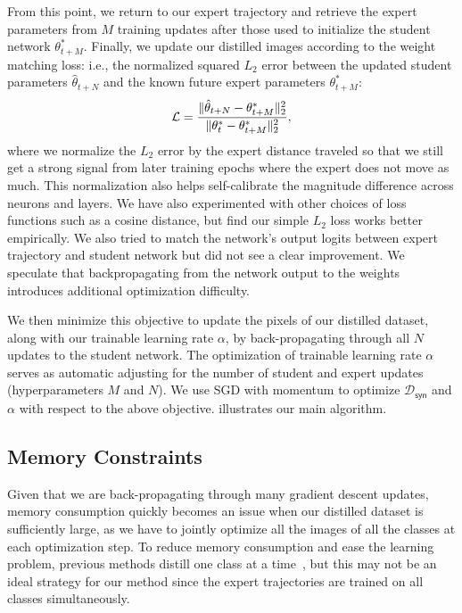 From this point, we return to our expert trajectory and retrieve the expert parameters from $M$ training updates after those used to initialize the student network $\theta^*_{t+M}$. Finally, we update our distilled images according to the weight matching loss: i.e., the normalized squared $L_2$ error between the updated student parameters $\hat{\theta}_{t+N}$ and the known future expert parameters $\theta^*_{t+M}$:
\begin{equation}
    \mathcal{L} = \frac{\|\hat{\theta}_{t+N} - \theta^*_{t+M}\|^2_2}{\|\theta^*_{t} - \theta^*_{t+M}\|_2^2}, %
    \lbleq{weight_matching}
\end{equation}%
where we normalize the $L_2$ error by the expert distance traveled so that we still get a strong signal from later training epochs where the expert does not move as much. This normalization also helps self-calibrate the magnitude difference across neurons and layers. We have also experimented with other choices of loss functions such as a cosine distance, but find our simple $L_2$ loss works better empirically. We also tried to match the network's output logits between expert trajectory and student network but did not see a clear improvement. We speculate that backpropagating from the network output to the weights introduces additional optimization difficulty.  %


We then minimize this objective to update the pixels of our distilled dataset, along with our trainable learning rate $\alpha$, by back-propagating through all $N$ updates to the student network. The optimization of trainable learning rate $\alpha$ serves as automatic adjusting for the number of student and expert updates (hyperparameters $M$ and $N$).  We use SGD with momentum to optimize $\mathcal{D}_\mathsf{syn}$ and $\alpha$ with respect to the above objective.  illustrates our main algorithm. 


\subsection{Memory Constraints}
Given that we are back-propagating through many gradient descent updates, memory consumption quickly becomes an issue when our distilled dataset is sufficiently large, as we have to jointly optimize all the images of all the classes at each optimization step. To reduce memory consumption and ease the learning problem, previous methods distill one class at a time~\cite{dc, dsa, dm}, but this may not be an ideal strategy for our method since the expert trajectories are trained on all classes simultaneously.

